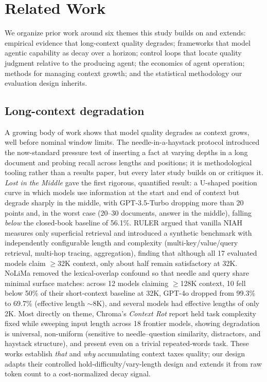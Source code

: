 \documentclass[11pt]{article}
\begin{document}


\section{Related Work}
\label{sec:related}

We organize prior work around six themes this study builds on and
extends: empirical evidence that long-context quality degrades; frameworks
that model agentic capability as decay over a horizon; control loops that
locate quality judgment relative to the producing agent; the economics of
agent operation; methods for managing context growth; and the statistical
methodology our evaluation design inherits.

\subsection{Long-context degradation}
\label{sec:rw-degradation}

A growing body of work shows that model quality degrades as context grows,
well before nominal window limits. The needle-in-a-haystack protocol
\cite{kamradt2023niah} introduced the now-standard pressure test of inserting
a fact at varying depths in a long document and probing recall across lengths
and positions; it is methodological tooling rather than a results paper, but
every later study builds on or critiques it. \emph{Lost in the Middle}
\cite{liu2024lostmiddle} gave the first rigorous, quantified result: a
U-shaped position curve in which models use information at the start and end
of context but degrade sharply in the middle, with GPT-3.5-Turbo dropping more
than 20 points and, in the worst case (20--30 documents, answer in the
middle), falling \emph{below} the closed-book baseline of 56.1\%. RULER
\cite{hsieh2024ruler} argued that vanilla NIAH measures only superficial
retrieval and introduced a synthetic benchmark with independently configurable
length and complexity (multi-key/value/query retrieval, multi-hop tracing,
aggregation), finding that although all 17 evaluated models claim
$\geq$32K context, only about half remain satisfactory at 32K. NoLiMa
\cite{modarressi2025nolima} removed the lexical-overlap confound so that
needle and query share minimal surface matches: across 12 models claiming
$\geq$128K context, 10 fell below 50\% of their short-context baseline at 32K,
GPT-4o dropped from 99.3\% to 69.7\% (effective length $\sim$8K), and several
models had effective lengths of only 2K. Most directly on theme, Chroma's
\emph{Context Rot} report \cite{hong2025contextrot} held task complexity fixed
while sweeping input length across 18 frontier models, showing degradation is
universal, non-uniform (sensitive to needle--question similarity, distractors,
and haystack structure), and present even on a trivial repeated-words task.
These works establish \emph{that} and \emph{why} accumulating context taxes
quality; our design adapts their controlled hold-difficulty/vary-length design
and extends it from raw token count to a cost-normalized decay signal.
\end{document}
